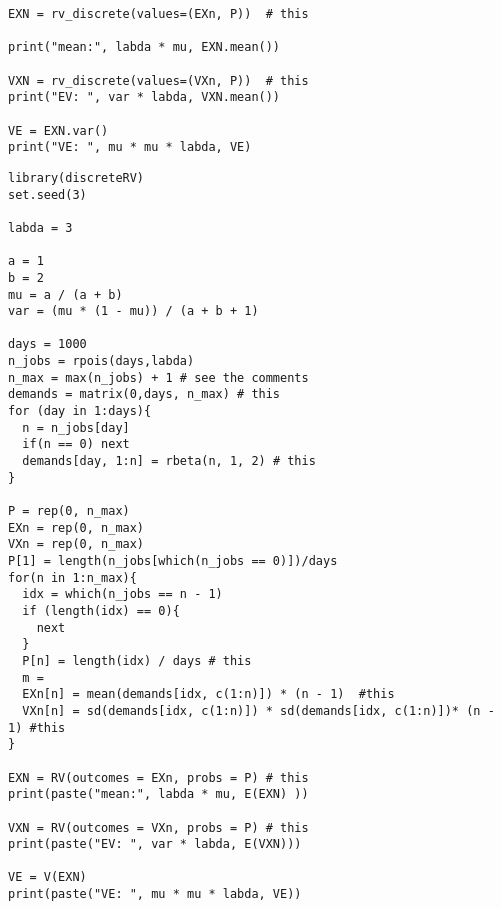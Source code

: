 \begin{exercise}
\begin{verbatim}
EXN = rv_discrete(values=(EXn, P))  # this

print("mean:", labda * mu, EXN.mean())

VXN = rv_discrete(values=(VXn, P))  # this
print("EV: ", var * labda, VXN.mean())

VE = EXN.var()
print("VE: ", mu * mu * labda, VE)
\end{verbatim}


\begin{verbatim}
library(discreteRV)
set.seed(3)

labda = 3

a = 1
b = 2
mu = a / (a + b)
var = (mu * (1 - mu)) / (a + b + 1)

days = 1000
n_jobs = rpois(days,labda)
n_max = max(n_jobs) + 1 # see the comments
demands = matrix(0,days, n_max) # this
for (day in 1:days){
  n = n_jobs[day]
  if(n == 0) next
  demands[day, 1:n] = rbeta(n, 1, 2) # this
}

P = rep(0, n_max)
EXn = rep(0, n_max)
VXn = rep(0, n_max)
P[1] = length(n_jobs[which(n_jobs == 0)])/days
for(n in 1:n_max){
  idx = which(n_jobs == n - 1)
  if (length(idx) == 0){
    next
  }
  P[n] = length(idx) / days # this
  m = 
  EXn[n] = mean(demands[idx, c(1:n)]) * (n - 1)  #this
  VXn[n] = sd(demands[idx, c(1:n)]) * sd(demands[idx, c(1:n)])* (n - 1) #this
}

EXN = RV(outcomes = EXn, probs = P) # this
print(paste("mean:", labda * mu, E(EXN) ))

VXN = RV(outcomes = VXn, probs = P) # this
print(paste("EV: ", var * labda, E(VXN)))

VE = V(EXN)
print(paste("VE: ", mu * mu * labda, VE))
\end{verbatim}

\end{exercise}


